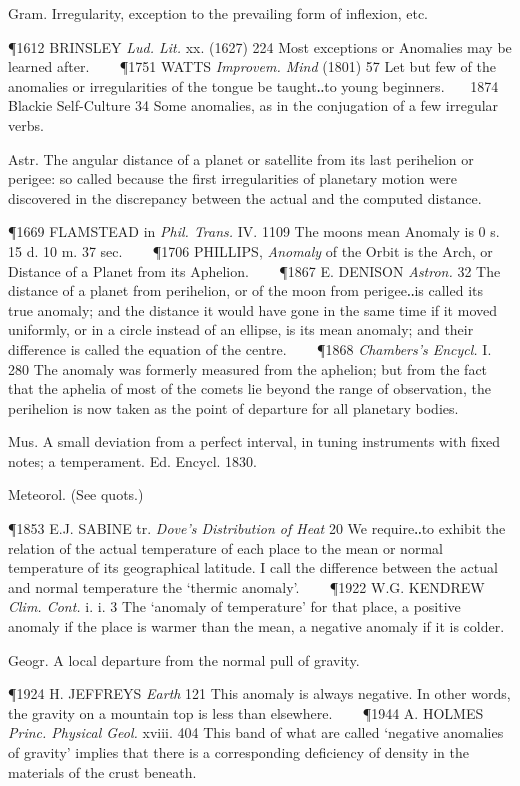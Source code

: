 \begin{description}[wide, labelwidth=!, labelindent=0pt]
\begin{myenumerate}
 Gram. Irregularity, exception to the prevailing form of inflexion, etc. 

\P 1612 BRINSLEY \textit{Lud. Lit.} xx. (1627) 224 Most exceptions or Anomalies may be
learned after.    
\P 1751 WATTS \textit{Improvem. Mind} (1801) 57 Let but few of the
anomalies or irregularities of the tongue be taught‥to young beginners.    1874
Blackie Self-Culture 34 Some anomalies, as in the conjugation of a few irregular
verbs.

 Astr. The angular distance of a planet or satellite from its last perihelion
or perigee: so called because the first irregularities of planetary motion were
discovered in the discrepancy between the actual and the computed distance. 

\P 1669 FLAMSTEAD in \textit{Phil. Trans.} IV. 1109 The moons mean Anomaly is 0 s. 15 d. 10 m. 37 sec.    
\P 1706 PHILLIPS, \textit{Anomaly} of the Orbit is the Arch, or Distance of
a Planet from its Aphelion.    
\P 1867 E. DENISON \textit{Astron.} 32 The distance of a
planet from perihelion, or of the moon from perigee‥is called its true anomaly;
and the distance it would have gone in the same time if it moved uniformly, or
in a circle instead of an ellipse, is its mean anomaly; and their difference is
called the equation of the centre.    
\P 1868 \textit{Chambers's Encycl.} I. 280 The anomaly
was formerly measured from the aphelion; but from the fact that the aphelia of
most of the comets lie beyond the range of observation, the perihelion is now
taken as the point of departure for all planetary bodies.

 Mus. A small deviation from a perfect interval, in tuning instruments with
fixed notes; a temperament. Ed. Encycl. 1830. 

 Meteorol. (See quots.) 

\P 1853 E.J. SABINE tr. \textit{Dove's Distribution of Heat} 20 We require‥to exhibit
the relation of the actual temperature of each place to the mean or normal
temperature of its geographical latitude. I call the difference between the
actual and normal temperature the ‘thermic anomaly’.    
\P 1922 W.G. KENDREW \textit{Clim. Cont.} i. i. 3 The ‘anomaly of temperature’ for that 
place, a positive anomaly if
the place is warmer than the mean, a negative anomaly if it is colder.

 Geogr. A local departure from the normal pull of gravity. 

\P 1924 H. JEFFREYS \textit{Earth} 121 This anomaly is always negative. In other words,
the gravity on a mountain top is less than elsewhere.    
\P 1944 A. HOLMES \textit{Princ. Physical Geol.} xviii. 404 This band of what 
are called ‘negative anomalies of
gravity’ implies that there is a corresponding deficiency of density in the
materials of the crust beneath.
\end{myenumerate}


\end{description}
